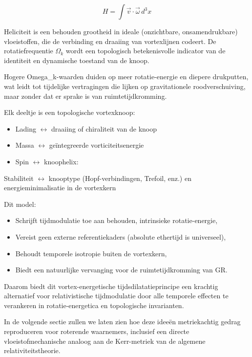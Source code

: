 \begin{equation}
H = \int \vec{v} \cdot \vec{\omega} \, d^3x \label{eq:helicity_rotation}
\end{equation}

Heliciteit is een behouden grootheid in ideale (onzichtbare, onsamendrukbare) vloeistoffen, die de verbinding en draaiing van vortexlijnen codeert. De rotatiefrequentie $\Omega_k$ wordt een topologisch betekenisvolle indicator van de identiteit en dynamische toestand van de knoop.

Hogere Omega_k-waarden duiden op meer rotatie-energie en diepere drukputten, wat leidt tot tijdelijke vertragingen die lijken op gravitationele roodverschuiving, maar zonder dat er sprake is van ruimtetijdkromming.

Elk deeltje is een topologische vortexknoop:
\begin{itemize}
\item Lading $\leftrightarrow$ draaiing of chiraliteit van de knoop
\item Massa $\leftrightarrow$ geïntegreerde vorticiteitsenergie
\item Spin $\leftrightarrow$ knoophelix:
\end{itemize}
Stabiliteit $\leftrightarrow$ knooptype (Hopf-verbindingen, Trefoil, enz.) en energieminimalisatie in de vortexkern

Dit model:

\begin{itemize}
\item Schrijft tijdmodulatie toe aan behouden, intrinsieke rotatie-energie,
\item Vereist geen externe referentiekaders (absolute ethertijd is universeel),
\item Behoudt temporele isotropie buiten de vortexkern,
\item Biedt een natuurlijke vervanging voor de ruimtetijdkromming van GR. \end{itemize}

Daarom biedt dit vortex-energetische tijdsdilatatieprincipe een krachtig alternatief voor relativistische tijdmodulatie door alle temporele effecten te verankeren in rotatie-energetica en topologische invarianten.

In de volgende sectie zullen we laten zien hoe deze ideeën metriekachtig gedrag reproduceren voor roterende waarnemers, inclusief een directe vloeistofmechanische analoog aan de Kerr-metriek van de algemene relativiteitstheorie.